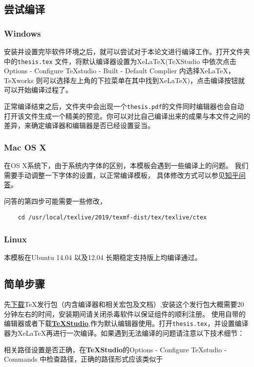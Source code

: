 \subsection{尝试编译}
\subsubsection{Windows}
安装并设置完毕软件环境之后，就可以尝试对于本论文进行编译工作。打开文件夹中的\verb|thesis.tex| 文件，将默认编译器设置为Xe\LaTeX(\TeX Studio 中依次点击Options - Configure TeXstudio - Built - Default Complier 内选择Xe\LaTeX ，\TeX works 则可以选择左上角的下拉菜单在其中找到Xe\LaTeX )，点击编译按钮就可以开始编译过程了。

正常编译结束之后，文件夹中会出现一个\verb|thesis.pdf|的文件同时编辑器也会自动打开该文件生成一个精美的预览。你可以对比自己编译出来的成果与本文件之间的差异，来确定编译器和编辑器是否已经设置妥当。
\subsubsection{Mac OS X}

在OS X系统下，由于系统内字体的区别，本模板会遇到一些编译上的问题。 我们需要手动调整一下字体的设置，以正常编译模板， 具体修改方式可以参见\href{http://www.zhihu.com/question/22906637}{知乎问答}。 

问答的第四步可能需要一些修改，
\begin{verbatim}
	cd /usr/local/texlive/2019/texmf-dist/tex/texlive/ctex
\end{verbatim}

\subsubsection{Linux}
本模板在Ubuntu 14.04 以及12.04 长期稳定支持版上均编译通过。

\subsection{简单步骤}
先\href{https://www.tug.org/texlive/acquire-iso.html}{下载}\TeX 发行包（内含编译器和相关宏包及文档）,安装这个发行包大概需要20分钟左右的时间，安装期间请关闭杀毒软件以保证组件的顺利注册。
使用自带的编辑器或者下载\href{http://texstudio.sourceforge.net/}{\textbf{\TeX Studio}},作为默认编辑器使用。打开\verb|thesis.tex|，并设置编译器为Xe\LaTeX 再进行一次编译。如果遇到无法编译的问题请注意以下技术细节：

相关路径设置是否正确，在\textbf{\TeX Studio}的Options - Configure TeXstudio - Commands 中检查路径，正确的路径\cite{谢琪-203}形式应该类似于

